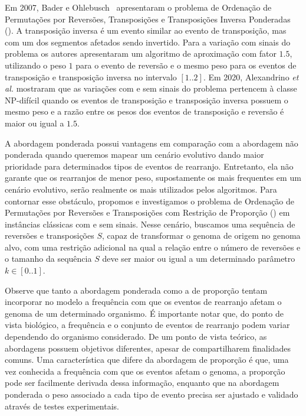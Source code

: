 Em 2007, Bader e Ohlebusch~\cite{2007-bader-ohlebusch} apresentaram o problema de Ordenação de Permutações por Reversões, Transposições e Transposições Inversa Ponderadas (\SbWRTIT). A transposição inversa é um evento similar ao evento de transposição, mas com um dos segmentos afetados sendo invertido. Para a variação com sinais do problema os autores apresentaram um algoritmo de aproximação com fator $1.5$, utilizando o peso $1$ para o evento de reversão e o mesmo peso para os eventos de transposição e transposição inversa no intervalo $[1..2]$. Em 2020, Alexandrino \textit{et al.}\cite{2020c-alexandrino-etal} mostraram que as variações com e sem sinais do problema \SbWRTIT{} pertencem à classe NP-difícil quando os eventos de transposição e transposição inversa possuem o mesmo peso e a razão entre os pesos dos eventos de transposição e reversão é maior ou igual a $1.5$.

A abordagem ponderada possui vantagens em comparação com a abordagem não ponderada quando queremos mapear um cenário evolutivo dando maior prioridade para determinados tipos de eventos de rearranjo. Entretanto, ela não garante que os rearranjos de menor peso, supostamente os mais frequentes em um cenário evolutivo, serão realmente os mais utilizados pelos algoritmos. Para contornar esse obstáculo, propomos e investigamos o problema de Ordenação de Permutações por Reversões e Transposições com Restrição de Proporção (\SbPRT) em instâncias clássicas com e sem sinais. Nesse cenário, buscamos uma sequência de reversões e transposições $S$, capaz de transformar o genoma de origem no genoma alvo, com uma restrição adicional na qual a relação entre o número de reversões e o tamanho da sequência $S$ deve ser maior ou igual a um determinado parâmetro $k \in [0..1]$. 

Observe que tanto a abordagem ponderada como a de proporção tentam incorporar no modelo a frequência com que os eventos de rearranjo afetam o genoma de um determinado organismo. É importante notar que, do ponto de vista biológico, a frequência e o conjunto de eventos de rearranjo podem variar dependendo do organismo considerado. De um ponto de vista teórico, as abordagens possuem objetivos diferentes, apesar de compartilharem finalidades comuns. Uma característica que difere da abordagem de proporção é que, uma vez conhecida a frequência com que os eventos afetam o genoma, a proporção pode ser facilmente derivada dessa informação, enquanto que na abordagem ponderada o peso associado a cada tipo de evento precisa ser ajustado e validado através de testes experimentais.

